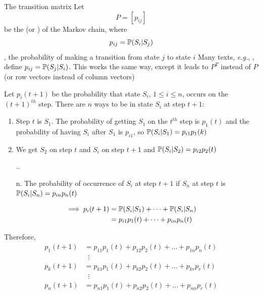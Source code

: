 \documentclass[aspectratio=169]{beamer}
\begin{document}
\begin{frame}{The transition matrix}
Let
\[
P=[p_{ij}]
\]
be the  (or ) of the Markov chain, where
\[
p_{ij} = \mathbb{P}(S_i|S_j)
\]
\ie, the probability of making a transition from state $j$ to state $i$
\vfill
Many texts, \emph{e.g.}, \cite{KemenySnell1983}, define $p_{ij}=\mathbb{P}(S_j|S_i)$. This works the same way, except it leads to $P^T$ instead of $P$ (or row vectors instead of column vectors)
\end{frame}

\begin{frame} 
Let $p_i(t+1)$ be the probability that state $S_i$, $1\leq i\leq n$, occurs on the $(t+1)^{th}$ step. 
There are $n$ ways to be in state $S_i$ at step $t+1$:
\begin{enumerate}
	\item Step $t$ is $S_1$. The probability of getting $S_1$ on the $t^{th}$ step is $p_1(t)$ and the probability of having $S_i$ after $S_1$ is $p_{i1}$, so $\mathbb{P}(S_i|S_1)=p_{i1}p_1(k)$
	\item We get $S_2$ on step $t$ and $S_i$ on step $t+1$ and $\mathbb{P}(S_i|S_2)=p_{i2}p_2(t)$
	\item[..]
	\item[n.] The probability of occurrence of $S_i$ at step $t+1$ if $S_n$ at step $t$ is $\mathbb{P}(S_i|S_n)=p_{in}p_n(t)$
\end{enumerate}
\vfill
\begin{align*}
\implies p_i(t+1) &= \mathbb{P}(S_i|S_1)+\cdots+\mathbb{P}(S_i|S_n) \\
&= p_{i1}p_1(t)+\cdots+p_{in}p_n(t)
\end{align*}
\end{frame}

\begin{frame} 
Therefore,
\begin{align*}
p_1(t+1) &= p_{11}p_1(t)+p_{12}p_2(t)+\dots+p_{1n}p_n(t) \\
& \;\;\vdots\\
p_k(t+1) &= p_{k1}p_1(t)+p_{k2}p_2(t)+\dots+p_{kr}p_r(t) \\
& \;\;\vdots\\
p_n(t+1) &= p_{n1}p_1(t)+p_{n2}p_2(t)+\dots+p_{nn}p_r(t)
\end{align*}
\end{frame}
\end{document}
